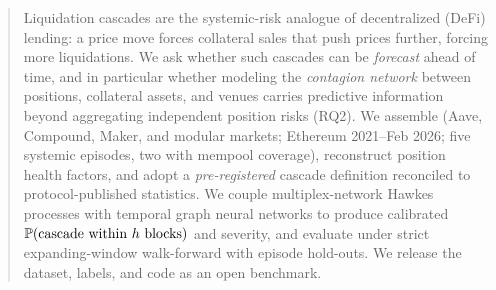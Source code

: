 \begin{abstract}
\noindent
{}
Liquidation cascades are the systemic-risk analogue of decentralized (DeFi)
lending: a price move forces collateral sales that push prices further, forcing
more liquidations.  We ask whether such cascades can be \emph{forecast}
ahead of time, and in particular whether modeling the \emph{contagion network}
between positions, collateral assets, and venues carries predictive information
beyond aggregating independent position risks (RQ2).
We assemble 
(Aave, Compound, Maker, and modular markets; Ethereum 2021--Feb 2026; five
systemic episodes, two with mempool coverage), reconstruct position health
factors, and adopt a \emph{pre-registered} cascade definition reconciled to
protocol-published statistics. We couple multiplex-network Hawkes processes with
temporal graph neural networks to produce calibrated $\Prob(\text{cascade within
}\horizon\text{ blocks})$ and severity, and evaluate under strict expanding-window
walk-forward with episode hold-outs.
 We release the dataset, labels, and code as an open benchmark.
\end{abstract}

